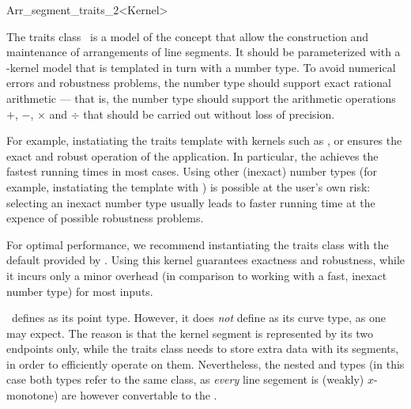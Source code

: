 
\ccRefPageBegin

\begin{ccRefClass}{Arr_segment_traits_2<Kernel>}
    
\ccDefinition 

The traits class \ccRefName\ is a model of the 
concept that allow the construction and maintenance of arrangements of
line segments. It should be parameterized with a \cgal-kernel model that is
templated in turn with a number type. To avoid numerical errors and
robustness problems, the number type should support exact rational
arithmetic --- that is, the number type should support the arithmetic
operations $+$, $-$, $\times$ and $\div$ that should be carried out
without loss of precision.

For example, instatiating the traits
template with kernels such as ,
or  ensures the exact and robust operation of
the application. In particular, the  achieves
the fastest running times in most cases. Using other (inexact) number
types (for example, instatiating the template with
) is possible at the user's own risk:
selecting an inexact number type usually leads to faster running time at
the expence of possible robustness problems.

For optimal performance, we recommend instantiating the traits class with
the default  provided by
\cgal. Using this kernel guarantees exactness and robustness, while it incurs
only a minor overhead (in comparison to working with a fast, inexact number
type) for most inputs.

\ccRefName\ defines  as its point type. However, it
does {\sl not} define  as its curve type, as one may
expect. The reason is that the kernel segment is represented by its
two endpoints only, while the traits class needs to store extra data
with its segments, in order to efficiently operate on them. Nevertheless,
the nested  and  types (in this
case both types refer to the same class, as {\sl every} line segement
is (weakly) $x$-monotone) are however convertable to the
.


\end{ccRefClass}
